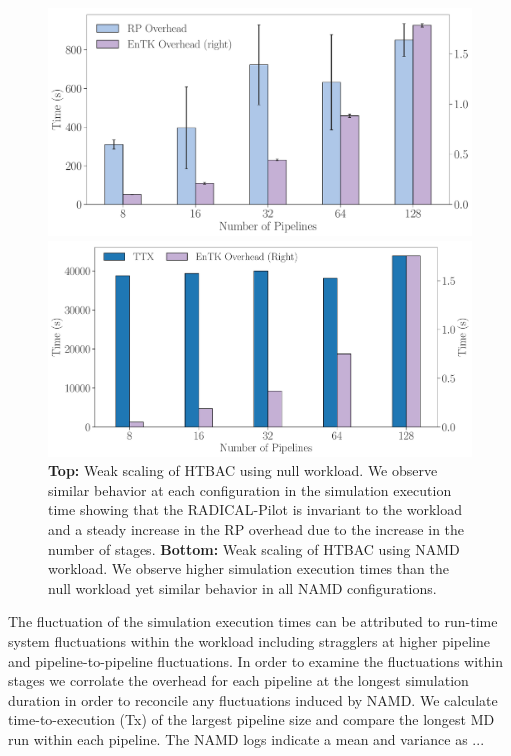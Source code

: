 \begin{figure}[!htbp]
  \centering
  \begin{minipage}[b]{0.49\textwidth}
  \centering
  \includegraphics[width=\textwidth]{FIGURES/null_workload_overheads.pdf}
  \end{minipage}
  \begin{minipage}[b]{0.49\textwidth}
  \centering
  \includegraphics[width=\textwidth]{FIGURES/namd_workload_overheads.pdf}
  \end{minipage}

\caption{\textbf{Top:} Weak scaling of HTBAC using null workload. We observe
similar behavior at each configuration in the simulation execution time
showing that the RADICAL-Pilot is invariant to the workload and a steady
increase in the RP overhead due to the increase in the number of stages.
\textbf{Bottom:} Weak scaling of HTBAC using NAMD workload. We observe higher
simulation execution times than the null workload yet similar behavior in
all NAMD configurations.}\label{fig:htbac_perf}
\end{figure}


The fluctuation of the simulation execution times can be attributed to run-time system fluctuations within the workload including stragglers at higher pipeline and pipeline-to-pipeline fluctuations. In order to examine the fluctuations within stages we corrolate the overhead for each pipeline at the longest simulation duration in order to reconcile any fluctuations induced by NAMD. We calculate time-to-execution (Tx) of the largest pipeline size and compare the longest MD run within each pipeline. The NAMD logs indicate a mean and variance as ...

